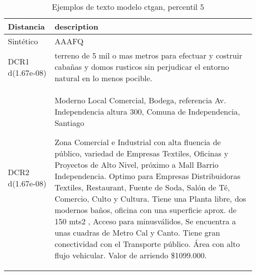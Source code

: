 \begin{table}[H]
\centering
\fontsize{10}{14}\selectfont
\caption{Ejemplos de texto modelo ctgan, percentil 5}
\label{table-example-economicos-b-2-ctgan-5p-text}
\begin{tabular}{|l|m{35em}|}
\hline
\rowcolor[gray]{0.8}
Distancia & description \\
\hline Sintético & AAAFQ \\
\hline DCR1 d(1.67e-08) & terreno de 5 mil o mas metros para efectuar y costruir caba\~nas y domos rusticos sin perjudicar el entorno natural en lo menos pocible. \\
\hline DCR2 d(1.67e-08) & Moderno  Local Comercial, Bodega, referencia Av. Independencia altura 300, Comuna de Independencia, Santiago

Zona Comercial e Industrial con alta fluencia de p\'ublico, variedad de Empresas Textiles, Oficinas y Proyectos de Alto Nivel, pr\'oximo a Mall Barrio Independencia. Optimo para Empresas Distribuidoras Textiles, Restaurant, Fuente de Soda, Sal\'on de T\'e, Comercio, Culto y Cultura. Tiene una Planta libre, dos modernos ba\~nos, oficina con una superficie aprox. de 150 mts2 , Acceso para minusv\'alidos,  Se encuentra a unas cuadras de Metro Cal y Canto. Tiene gran conectividad con el Transporte p\'ublico. \'Area con alto flujo vehicular. Valor de arriendo \$1099.000. \\
\hline
\end{tabular}
\end{table}

